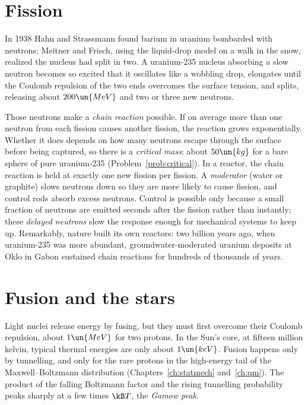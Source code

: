 \section{Fission}

In 1938 Hahn and Strassmann found barium in uranium bombarded with neutrons; Meitner and Frisch, using the liquid-drop model on a walk in the snow, realized the nucleus had split in two. A uranium-235 nucleus absorbing a slow neutron becomes so excited that it oscillates like a wobbling drop, elongates until the Coulomb repulsion of the two ends overcomes the surface tension, and splits, releasing about $200\un{MeV}$ and two or three new neutrons.

Those neutrons make a \emph{chain reaction} possible. If on average more than one neutron from each fission causes another fission, the reaction grows exponentially. Whether it does depends on how many neutrons escape through the surface before being captured, so there is a \emph{critical mass}: about $50\un{kg}$ for a bare sphere of pure uranium-235 (Problem~\ref{prob:critical}). In a reactor, the chain reaction is held at exactly one new fission per fission. A \emph{moderator} (water or graphite) slows neutrons down so they are more likely to cause fission, and control rods absorb excess neutrons. Control is possible only because a small fraction of neutrons are emitted seconds after the fission rather than instantly; these \emph{delayed neutrons} slow the response enough for mechanical systems to keep up. Remarkably, nature built its own reactors: two billion years ago, when uranium-235 was more abundant, groundwater-moderated uranium deposits at Oklo in Gabon sustained chain reactions for hundreds of thousands of years.

\section{Fusion and the stars}

Light nuclei release energy by fusing, but they must first overcome their Coulomb repulsion, about $1\un{MeV}$ for two protons. In the Sun's core, at fifteen million kelvin, typical thermal energies are only about $1\un{keV}$. Fusion happens only by tunnelling, and only for the rare protons in the high-energy tail of the Maxwell--Boltzmann distribution (Chapters~\ref{ch:statmech} and~\ref{ch:qm}). The product of the falling Boltzmann factor and the rising tunnelling probability peaks sharply at a few times $\kB T$, the \emph{Gamow peak}.

